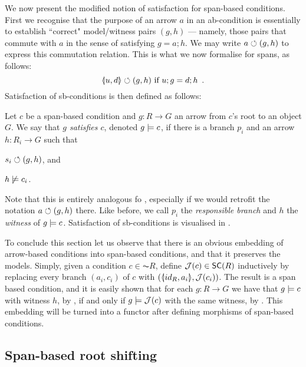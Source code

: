 We now present the modified notion of satisfaction for span-based conditions. First we recognise that the purpose of an arrow $a$ in an ab-condition is essentially to establish ``correct" model/witness pairs $(g,h)$ --- namely, those pairs that commute with $a$ in the sense of satisfying $g=a;h$. We may write $a\circlearrowleft (g,h)$ to express this commutation relation. This is what we now formalise for spans, as follows:
\[ \spanof u d \commutes (g,h) \text{ if } u;g=d;h \enspace. \]
Satisfaction of sb-conditions is then defined as follows:

\begin{definition}
  Let $c$ be a span-based condition and $g:R\to G$ an arrow from $c$'s root to an object $G$. We say that \emph{$g$ satisfies $c$}, denoted $g\models c$, if there is a branch $p_i$ and an arrow $h:R_i\to G$ such that
  \begin{enumerate*}
  \item $s_i \circlearrowleft (g, h)$, and
  \item $h\not\models c_i$.
  \end{enumerate*}
\end{definition}
%
Note that this is entirely analogous fo , especially if we would retrofit the notation $a\circlearrowleft (g,h)$ there. Like before, we call $p_i$ the \emph{responsible branch} and $h$ the \emph{witness} of $g\models c$. Satisfaction of sb-conditions is visualised in .

To conclude this section let us observe that there is an obvious embedding of arrow-based conditions into span-based conditions, and that it preserves the models. Simply, given a condition $c \in \AC {R}$, define $\cJ(c)\in \SC R$ inductively by replacing every branch $(a_i,c_i)$ of $c$ with $(\spanof{id_R}{a_i},\cJ(c_i))$. 
The result is a span based condition, and it is easily shown that for each $g:R \to G$ we have that $g \models c$ with witness $h$, by , if and only if $g \models \mathcal{J}(c)$ with the same witness, by . This embedding will be turned into a functor after defining morphisms of span-based conditions. 

\subsection{Span-based root shifting}

